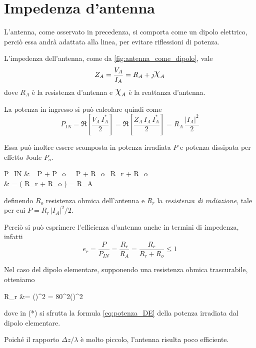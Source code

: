 \section{Impedenza d'antenna}
L'antenna, come osservato in precedenza, si comporta come un dipolo elettrico, perciò essa andrà adattata alla linea, per evitare riflessioni di potenza.

L'impedenza dell'antenna, come da \autoref{fig:antenna_come_dipolo}, vale
\begin{equation}
	Z_A = \frac{V_A}{I_A} = R_A + \jmath \Chi_A
\end{equation}
dove $R_A$ è la resistenza d'antenna e $\Chi_A$ è la reattanza d'antenna.

La potenza in ingresso si può calcolare quindi come
\begin{equation*}
	P_{IN}
	= \Re \left[ \frac{V_A \, I_A^*}{2} \right]
	= \Re \left[ \frac{Z_A \, I_A \, I_A^*}{2} \right]
	= R_A \, \frac{|I_A|^2}{2}
\end{equation*}

Essa può inoltre essere scomposta in potenza irradiata $P$ e potenza dissipata per effetto Joule $P_o$.
\begin{esp*}
	P_{IN}
	&= P + P_o
	= P + R_o \, 
	\stackrel{(*)}{=} R_r  + R_o \\
	& = \left( R_r + R_o  \right) 
	= R_A \, 
\end{esp*}
definendo $R_o$ resistenza ohmica dell'antenna e $R_r$ la \emph{resistenza di radiazione}, tale per cui $P=R_r \, |I_A|^2 / 2$.

Perciò si può esprimere l'efficienza d'antenna anche in termini di impedenza, infatti
\begin{equation*}
	e_r
	= \frac{P}{P_{IN}}
	= \frac{R_r}{R_A}
	= \frac{R_r}{R_r + R_o}
	\le 1
\end{equation*}

Nel caso del dipolo elementare, supponendo una resistenza ohmica trascurabile, otteniamo

\begin{esp}\label{eq:pot-resRadDE}
	R_r
	&= 
	\stackrel{(*)}{=} \pi \eta \left(\right)^2
	= 80\pi^2\left(\right)^2 \Omega
\end{esp}
dove in (*) si sfrutta la formula \autoref{eq:potenza_DE} della potenza irradiata dal dipolo elementare.

Poiché il rapporto $\Delta z / \lambda$ è molto piccolo, l'antenna risulta poco efficiente.

